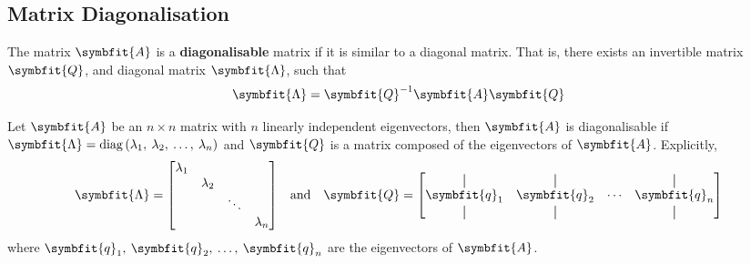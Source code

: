 \documentclass{article}
\begin{document}
	\subsection{Matrix Diagonalisation}
	\begin{definition}
		The matrix $\symbfit{A}$ is a \textbf{diagonalisable} matrix if it is similar to a diagonal matrix. That is, there exists an invertible matrix $\symbfit{Q}$, and diagonal matrix $\symbfit{\Lambda}$, such that
		\begin{equation*}
			\symbfit{\Lambda}=\symbfit{Q}^{-1}\symbfit{A}\symbfit{Q}
		\end{equation*}
	\end{definition}
	\begin{theorem}
		Let $\symbfit{A}$ be an $n \times n$ matrix with $n$ linearly independent eigenvectors, then $\symbfit{A}$ is diagonalisable if $\symbfit{\Lambda}=\diag{\left( \lambda_1,\: \lambda_2,\: \dots,\: \lambda_n \right)}$ and $\symbfit{Q}$ is a matrix composed of the eigenvectors of $\symbfit{A}$. Explicitly,
		\begin{equation*}
			\symbfit{\Lambda} = 
			\mqty[
				\lambda_1 & & & \\
				& \lambda_2 & & \\
				& & \ddots & \\
				& & & \lambda_n
				]\quad
				\text{and}\quad
			\symbfit{Q} = \mqty[
				\vertbar & \vertbar & & \vertbar \\ 
				\symbfit{q}_1 & \symbfit{q}_2 & \cdots & \symbfit{q}_n \\ 
				\vertbar & \vertbar & & \vertbar
			]
		\end{equation*}
		where $\symbfit{q}_1,\: \symbfit{q}_2,\: \dots,\: \symbfit{q}_n$ are the eigenvectors of $\symbfit{A}$.
	\end{theorem}
\end{document}

